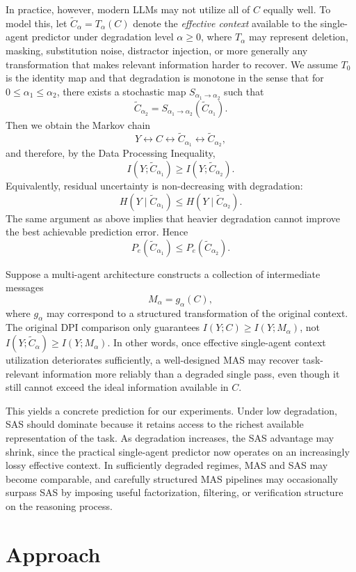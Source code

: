 \documentclass{article} %
\begin{document}
In practice, however, modern LLMs may not utilize all of \(C\) equally well. To model this, let \(\tilde{C}_{\alpha} = T_{\alpha}(C)\) denote the \emph{effective context} available to the single-agent predictor under degradation level \(\alpha \ge 0\), where \(T_{\alpha}\) may represent deletion, masking, substitution noise, distractor injection, or more generally any transformation that makes relevant information harder to recover. We assume \(T_{0}\) is the identity map and that degradation is monotone in the sense that for \(0 \le \alpha_1 \le \alpha_2\), there exists a stochastic map \(S_{\alpha_1 \to \alpha_2}\) such that
\[
\tilde{C}_{\alpha_2} = S_{\alpha_1 \to \alpha_2}(\tilde{C}_{\alpha_1}).
\]
Then we obtain the Markov chain
\[
Y \longleftrightarrow C \longleftrightarrow \tilde{C}_{\alpha_1} \longleftrightarrow \tilde{C}_{\alpha_2},
\]
and therefore, by the Data Processing Inequality,
\[
I(Y;\tilde{C}_{\alpha_1}) \ge I(Y;\tilde{C}_{\alpha_2}).
\]
Equivalently, residual uncertainty is non-decreasing with degradation:
\[
H(Y \mid \tilde{C}_{\alpha_1}) \le H(Y \mid \tilde{C}_{\alpha_2}).
\]
The same argument as above implies that heavier degradation cannot improve the best achievable prediction error. Hence
\[
P_e(\tilde{C}_{\alpha_1}) \le P_e(\tilde{C}_{\alpha_2}).
\]

Suppose a multi-agent architecture constructs a collection of intermediate messages
\[
M_{\alpha} = g_{\alpha}(C),
\]
where \(g_{\alpha}\) may correspond to a structured transformation of the original context. The original DPI comparison only guarantees \(I(Y;C) \ge I(Y;M_{\alpha})\), not \(I(Y;\tilde{C}_{\alpha}) \ge I(Y;M_{\alpha})\). In other words, once effective single-agent context utilization deteriorates sufficiently, a well-designed MAS may recover task-relevant information more reliably than a degraded single pass, even though it still cannot exceed the ideal information available in \(C\).

This yields a concrete prediction for our experiments. Under low degradation, SAS should dominate because it retains access to the richest available representation of the task. As degradation increases, the SAS advantage may shrink, since the practical single-agent predictor now operates on an increasingly lossy effective context. In sufficiently degraded regimes, MAS and SAS may become comparable, and carefully structured MAS pipelines may occasionally surpass SAS by imposing useful factorization, filtering, or verification structure on the reasoning process.

\section{Approach}
\end{document}
